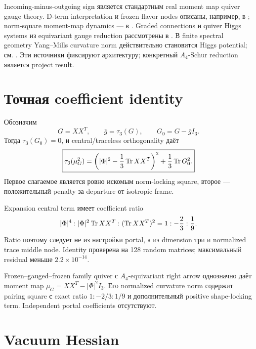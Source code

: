 Incoming-minus-outgoing sign является стандартным real moment map quiver
gauge theory. D-term interpretation и frozen flavor nodes описаны, например,
в ; norm-square moment-map dynamics --- в
. Graded connections и quiver Higgs systems из
equivariant gauge reduction рассмотрены в . В
finite spectral geometry Yang--Mills curvature norm действительно становится
Higgs potential; см. . Эти источники фиксируют
архитектуру; конкретный \(A_4\)-Schur reduction является project result.

\section{Точная coefficient identity}

Обозначим
\begin{equation}
 G=XX^T,
 \qquad
 \bar g=\tau_3(G),
 \qquad
 G_0=G-\bar gI_3.
\end{equation}
Тогда \(\tau_3(G_0)=0\), и central/traceless orthogonality даёт
\begin{equation}
 \boxed{
 \tau_3(\mu_G^2)
 =\left(|\Phi|^2-\frac13\operatorname{Tr} XX^T\right)^2
 +\frac13\operatorname{Tr} G_0^2.}
 \label{eq:moment-map-central-shape-decomposition}
\end{equation}
Первое слагаемое является ровно искомым norm-locking square, второе ---
положительный penalty за departure от isotropic frame.

Expansion central term имеет coefficient ratio
\begin{equation}
 |\Phi|^4:
 |\Phi|^2\operatorname{Tr} XX^T:
 (\operatorname{Tr} XX^T)^2
 =1:-\frac23:\frac19.
 \label{eq:derived-pairing-ratio}
\end{equation}
Ratio поэтому следует не из настройки portal, а из dimension три и
normalized trace middle node. Identity проверена на 128 random matrices;
максимальный residual меньше \(2.2\times10^{-14}\).

\begin{theorem}
Frozen--gauged--frozen family quiver с \(A_4\)-equivariant right arrow
однозначно даёт moment map
\(\mu_G=XX^T-|\Phi|^2I_3\). Его normalized curvature norm содержит
pairing square с exact ratio \(1:-2/3:1/9\) и дополнительный positive
shape-locking term. Independent portal coefficients отсутствуют.
\end{theorem}

\section{Vacuum Hessian}

